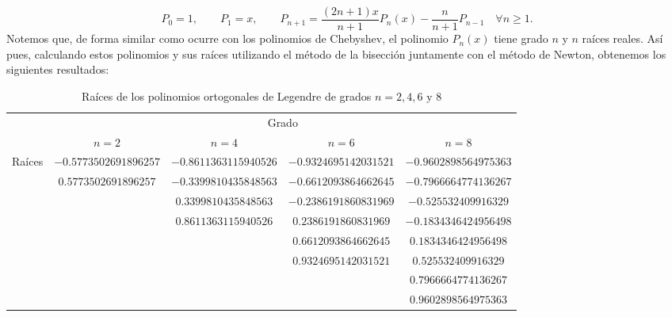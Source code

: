 \documentclass[a4paper]{article}
\begin{document}
$$P_0=1,\qquad P_1=x,\qquad P_{n+1}=\frac{(2n+1)x}{n+1}P_n(x)-\frac{n}{n+1}P_{n-1}\quad\forall n\geq 1.$$ Notemos que, de forma similar como ocurre con los polinomios de Chebyshev, el polinomio $P_n(x)$ tiene grado $n$ y $n$ raíces reales. Así pues, calculando estos polinomios y sus raíces utilizando el método de la bisección juntamente con el método de Newton, obtenemos los siguientes resultados:
\begin{table}[ht]
    \centering
    \begin{tabular}{|c|c|c|c|c|}
        \cline{2-5}
        \multicolumn{1}{c|}{} & \multicolumn{4}{c|}{Grado}\\
        \cline{2-5}
        \multicolumn{1}{c|}{} & $n=2$ & $n=4$ & $n=6$ & $n=8$ \\
        \hline
        \multirow{8}{*}{Raíces} & $-0.5773502691896257$ & $-0.8611363115940526$ & $-0.9324695142031521$ & $-0.9602898564975363$ \\
        & $0.5773502691896257$ & $-0.3399810435848563$ & $-0.6612093864662645$ & $-0.7966664774136267$ \\
        & & $0.3399810435848563$ & $-0.2386191860831969$ & $-0.525532409916329$ \\
        & & $0.8611363115940526$ & $0.2386191860831969$ & $-0.1834346424956498$ \\
        & & & $0.6612093864662645$ & $0.1834346424956498$ \\
        & & & $0.9324695142031521$ & $0.525532409916329$ \\
        & & & & $0.7966664774136267$ \\
        & & & & $0.9602898564975363$ \\
        \hline
    \end{tabular}
    \caption{Raíces de los polinomios ortogonales de Legendre de grados $n=2,4,6\text{ y }8$}
\end{table}
\end{document}
